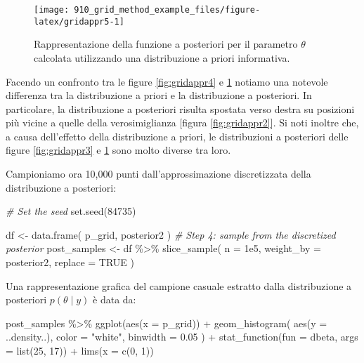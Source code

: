\documentclass[
]{memoir}
\newenvironment{Shaded}{\begin{snugshade}}{\end{snugshade}}
\newcommand{\AttributeTok}[1]{\textcolor[rgb]{0.77,0.63,0.00}{#1}}
\newcommand{\CommentTok}[1]{\textcolor[rgb]{0.56,0.35,0.01}{\textit{#1}}}
\newcommand{\ConstantTok}[1]{\textcolor[rgb]{0.00,0.00,0.00}{#1}}
\newcommand{\DecValTok}[1]{\textcolor[rgb]{0.00,0.00,0.81}{#1}}
\newcommand{\FloatTok}[1]{\textcolor[rgb]{0.00,0.00,0.81}{#1}}
\newcommand{\FunctionTok}[1]{\textcolor[rgb]{0.00,0.00,0.00}{#1}}
\newcommand{\NormalTok}[1]{#1}
\newcommand{\OtherTok}[1]{\textcolor[rgb]{0.56,0.35,0.01}{#1}}
\newcommand{\SpecialCharTok}[1]{\textcolor[rgb]{0.00,0.00,0.00}{#1}}
\newcommand{\StringTok}[1]{\textcolor[rgb]{0.31,0.60,0.02}{#1}}
\begin{document}
\begin{figure}

{\centering \texttt{[image: 910\_grid\_method\_example\_files/figure-latex/gridappr5-1]} 

}

\caption{Rappresentazione della funzione a posteriori per il parametro $\theta$ calcolata utilizzando una distribuzione a priori informativa.}\label{fig:gridappr5}
\end{figure}

Facendo un confronto tra le figure \ref{fig:gridappr4} e \ref{fig:gridappr5} notiamo una notevole differenza tra la distribuzione a priori e la distribuzione a posteriori. In particolare, la distribuzione a posteriori risulta spostata verso destra su posizioni più vicine a quelle della verosimiglianza {[}figura \ref{fig:gridappr2}{]}. Si noti inoltre che, a causa dell'effetto della distribuzione a priori, le distribuzioni a posteriori delle figure \ref{fig:gridappr3} e \ref{fig:gridappr5} sono molto diverse tra loro.

Campioniamo ora 10,000 punti dall'approssimazione discretizzata della distribuzione a posteriori:

\begin{Shaded}
\begin{Highlighting}[]
\CommentTok{\# Set the seed}
\FunctionTok{set.seed}\NormalTok{(}\DecValTok{84735}\NormalTok{)}

\NormalTok{df }\OtherTok{\textless{}{-}} \FunctionTok{data.frame}\NormalTok{(}
\NormalTok{  p\_grid,}
\NormalTok{  posterior2}
\NormalTok{)}
\CommentTok{\# Step 4: sample from the discretized posterior}
\NormalTok{post\_samples }\OtherTok{\textless{}{-}}\NormalTok{ df }\SpecialCharTok{\%\textgreater{}\%}
  \FunctionTok{slice\_sample}\NormalTok{(}
    \AttributeTok{n =} \FloatTok{1e5}\NormalTok{,}
    \AttributeTok{weight\_by =}\NormalTok{ posterior2,}
    \AttributeTok{replace =} \ConstantTok{TRUE}
\NormalTok{  )}
\end{Highlighting}
\end{Shaded}

\noindent
Una rappresentazione grafica del campione casuale estratto dalla distribuzione a posteriori \(p(\theta \mid y)\) è data da:

\begin{Shaded}
\begin{Highlighting}[]
\NormalTok{post\_samples }\SpecialCharTok{\%\textgreater{}\%}
  \FunctionTok{ggplot}\NormalTok{(}\FunctionTok{aes}\NormalTok{(}\AttributeTok{x =}\NormalTok{ p\_grid)) }\SpecialCharTok{+}
  \FunctionTok{geom\_histogram}\NormalTok{(}
    \FunctionTok{aes}\NormalTok{(}\AttributeTok{y =}\NormalTok{ ..density..),}
    \AttributeTok{color =} \StringTok{"white"}\NormalTok{,}
    \AttributeTok{binwidth =} \FloatTok{0.05}
\NormalTok{  ) }\SpecialCharTok{+}
  \FunctionTok{stat\_function}\NormalTok{(}\AttributeTok{fun =}\NormalTok{ dbeta, }\AttributeTok{args =} \FunctionTok{list}\NormalTok{(}\DecValTok{25}\NormalTok{, }\DecValTok{17}\NormalTok{)) }\SpecialCharTok{+}
  \FunctionTok{lims}\NormalTok{(}\AttributeTok{x =} \FunctionTok{c}\NormalTok{(}\DecValTok{0}\NormalTok{, }\DecValTok{1}\NormalTok{))}
\end{Highlighting}
\end{Shaded}
\end{document}
